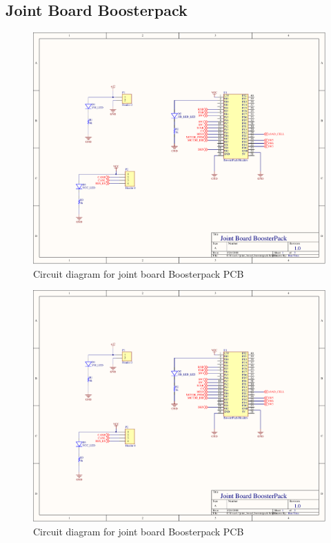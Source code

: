 \begin{flushleft}
\section{Joint Board Boosterpack}
\end{flushleft}
\label{app:joint_board_boosterpack}
\begin{figure}[H]
	\centering
	\includegraphics[page=1,scale=0.8,angle=270]{PDFs/joint_board_boosterpack.PDF}
	\caption{Circuit diagram for joint board Boosterpack PCB}
	\label{fig:joint_board_boosterpack_circuit1}
\end{figure}
\begin{figure}[H]
	\centering
	\includegraphics[page=2,scale=0.8,angle=270]{PDFs/joint_board_boosterpack.PDF}
	\caption{Circuit diagram for joint board Boosterpack PCB}
	\label{fig:joint_board_boosterpack_circuit2}
\end{figure}
